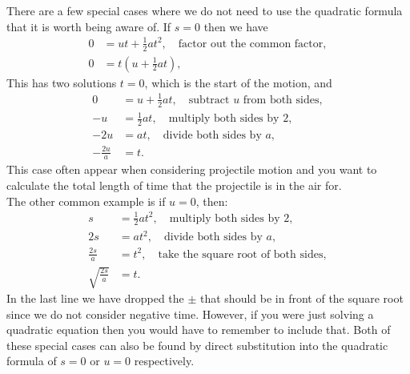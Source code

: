 \documentclass[a4paper,12pt]{book}
\begin{document}
There are a few special cases where we do not need to use the quadratic formula that it is worth being aware of. If $s=0$ then we have
\begin{align*}
0&=ut+\frac{1}{2}at^{2}, \quad \text{factor out the common factor},\\
0&=t\left(u+\frac{1}{2}at\right),
\end{align*}
This has two solutions $t=0$, which is the start of the motion, and
\begin{align*}
0&=u+\frac{1}{2}at, \quad \text{subtract $u$ from both sides},\\
-u&=\frac{1}{2}at, \quad \text{multiply both sides by $2$},\\
-2u&=at, \quad \text{divide both sides by $a$},\\
-\frac{2u}{a}&=t.
\end{align*}
This case often appear when considering projectile motion and you want to calculate the total length of time that the projectile is in the air for.\\

The other common example is if $u=0$, then:
\begin{align*}
s&=\frac{1}{2}at^{2}, \quad \text{multiply both sides by $2$},\\
2s&=at^{2}, \quad \text{divide both sides by $a$},\\
\frac{2s}{a}&=t^{2}, \quad \text{take the square root of both sides},\\
\sqrt{\frac{2s}{a}}&=t.
\end{align*}
In the last line we have dropped the $\pm$ that should be in front of the square root since we do not consider negative time. However, if you were just solving a quadratic equation then you would have to remember to include that.  Both of these special cases can also be found by direct substitution into the quadratic formula of $s=0$ or $u=0$ respectively.\\
\end{document}
